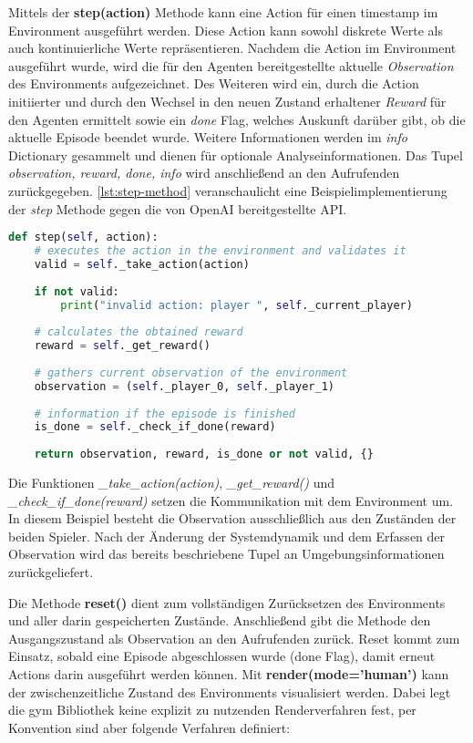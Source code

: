 \documentclass[11pt]{scrartcl}
\begin{document}
Mittels der \textbf{step(action)} Methode kann eine Action für einen timestamp im
Environment ausgeführt werden. Diese Action kann sowohl diskrete Werte als auch 
kontinuierliche Werte repräsentieren. Nachdem die Action im Environment ausgeführt wurde,
wird die für den Agenten bereitgestellte aktuelle \textit{Observation} des Environments
aufgezeichnet. Des Weiteren wird ein, durch die Action initiierter und durch den Wechsel
in den neuen Zustand erhaltener \textit{Reward} für den Agenten ermittelt sowie ein 
\textit{done} Flag, welches Auskunft darüber gibt, ob die aktuelle Episode beendet wurde.
Weitere Informationen werden im \textit{info} Dictionary gesammelt und dienen für optionale
Analyseinformationen. Das Tupel \textit{observation, reward, done, info} wird anschließend
an den Aufrufenden zurückgegeben. \autoref{lst:step-method} veranschaulicht eine
Beispielimplementierung der \textit{step} Methode gegen die von OpenAI bereitgestellte API.

\begin{lstlisting}[language=Python, caption=step method, label=lst:step-method]
def step(self, action):
	# executes the action in the environment and validates it
	valid = self._take_action(action)
	
	if not valid:
		print("invalid action: player ", self._current_player)
	
	# calculates the obtained reward
	reward = self._get_reward()
	
	# gathers current observation of the environment
	observation = (self._player_0, self._player_1)
	
	# information if the episode is finished
	is_done = self._check_if_done(reward)
    
	return observation, reward, is_done or not valid, {}
\end{lstlisting}
\noindent
Die Funktionen \textit{\_take\_action(action)}, \textit{\_get\_reward()} und
\textit{\_check\_if\_done(reward)} setzen die Kommunikation mit dem Environment um. In
diesem Beispiel besteht die Observation ausschließlich aus den Zuständen der beiden Spieler.
Nach der Änderung der Systemdynamik und dem Erfassen der Observation wird das bereits
beschriebene Tupel an Umgebungsinformationen zurückgeliefert.

Die Methode \textbf{reset()} dient zum vollständigen Zurücksetzen des Environments und aller
darin gespeicherten Zustände. Anschließend gibt die Methode den Ausgangszustand als Observation
an den Aufrufenden zurück. Reset kommt zum Einsatz, sobald eine Episode abgeschlossen wurde
(done Flag), damit erneut Actions darin ausgeführt werden können.
\newline
\noindent
Mit \textbf{render(mode='human')} kann der zwischenzeitliche Zustand des Environments
visualisiert werden. Dabei legt die gym Bibliothek keine explizit zu nutzenden Renderverfahren
fest, per Konvention sind aber folgende Verfahren definiert: 
\end{document}
